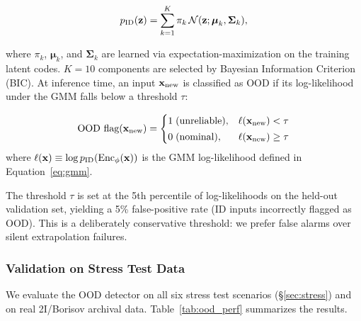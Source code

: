 \documentclass[usenatbib]{mnras}
\begin{document}
\begin{equation}\label{eq:gmm}
p_{\rm ID}(\mathbf{z}) = \sum_{k=1}^{K} \pi_k \, \mathcal{N}(\mathbf{z}; \boldsymbol{\mu}_k, \boldsymbol{\Sigma}_k),
\end{equation}

where $\pi_k$, $\boldsymbol{\mu}_k$, and $\boldsymbol{\Sigma}_k$ are learned via expectation-maximization on the training latent codes. $K=10$ components are selected by Bayesian Information Criterion (BIC). At inference time, an input $\mathbf{x}_{\rm new}$ is classified as OOD if its log-likelihood under the GMM falls below a threshold $\tau$:

\begin{equation}\label{eq:ood_flag}
\text{OOD flag}(\mathbf{x}_{\rm new}) =
\begin{cases}
1 \; \text{(unreliable)}, & \ell(\mathbf{x}_{\rm new}) < \tau \\[2pt]
0 \; \text{(nominal)},   & \ell(\mathbf{x}_{\rm new}) \geq \tau
\end{cases}
\end{equation}
where $\ell(\mathbf{x}) \equiv \log p_{\rm ID}(\text{Enc}_\phi(\mathbf{x}))$ is the GMM log-likelihood defined in Equation~\ref{eq:gmm}.

The threshold $\tau$ is set at the 5th percentile of log-likelihoods on the held-out validation set, yielding a 5\% false-positive rate (ID inputs incorrectly flagged as OOD). This is a deliberately conservative threshold: we prefer false alarms over silent extrapolation failures.

\subsubsection{Validation on Stress Test Data}

We evaluate the OOD detector on all six stress test scenarios (\S\ref{sec:stress}) and on real 2I/Borisov archival data. Table~\ref{tab:ood_perf} summarizes the results.
\end{document}
